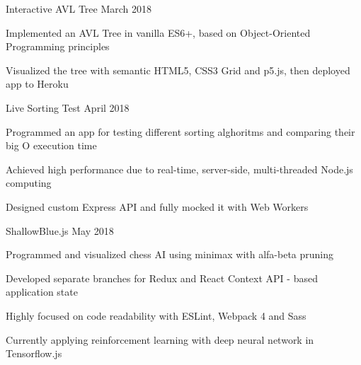 
\begin{cventries}

\cventryproject
  {Interactive AVL Tree} %
  {March 2018} %
  {
    \begin{cvitems} %
      \item Implemented an AVL Tree in vanilla ES6+, based on Object-Oriented Programming principles
      \item Visualized the tree with semantic HTML5, CSS3 Grid and p5.js, then deployed app to Heroku
  \end{cvitems}
  }

\cventryproject
{Live Sorting Test} %
{April 2018} %
  {
    \begin{cvitems} %
      \item Programmed an app for testing different sorting alghoritms and comparing their big O execution time
      \item Achieved high performance due to real-time, server-side, multi-threaded Node.js computing
      \item Designed custom Express API and fully mocked it with Web Workers
  \end{cvitems}
  }

\cventryproject
{ShallowBlue.js} %
{May 2018} %
  {
    \begin{cvitems} %
      \item Programmed and visualized chess AI using minimax with alfa-beta pruning
      \item Developed separate branches for Redux and React Context API - based application state
      \item Highly focused on code readability with ESLint, Webpack 4 and Sass
      \item Currently applying reinforcement learning with deep neural network in Tensorflow.js
  \end{cvitems}
  }


\end{cventries}
